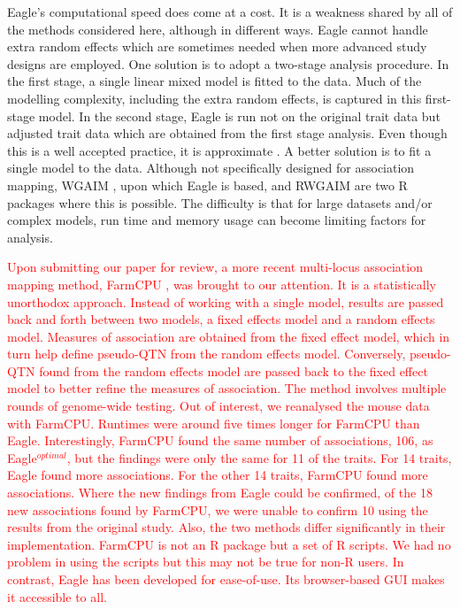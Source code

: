 \documentclass{bioinfo}
\begin{document}
Eagle's computational speed does come at a cost. It is a weakness shared by all of the methods considered here, although in different ways. 
Eagle cannot handle extra random effects which are sometimes needed when more advanced study designs are employed. One solution 
is to adopt a two-stage analysis procedure. In the first stage, a single linear mixed model is fitted to the data. Much of the modelling complexity, 
including the extra random effects, is 
captured in this first-stage model. In the second stage, Eagle is run not on the original trait data but adjusted trait data which are obtained from the first stage analysis. Even though this is a well accepted practice, it is approximate \citep{gogel2018comparison}.  A better solution is to fit a single model to the data. 
Although not specifically designed for association mapping,
WGAIM \citep{verbyla2007analysis}, upon which Eagle is based, and RWGAIM \citep{verbyla2012rwgaim}  are two R packages where this is possible. The difficulty is that for large datasets and/or complex 
models,  run time and memory usage can become limiting factors for analysis. 

\textcolor{red}{
Upon submitting our paper for review, a more recent multi-locus association mapping method, FarmCPU \citep{liu2016iterative}, was brought to our attention. 
It is a statistically unorthodox approach. Instead of working with a single model, results are passed back and forth between two models, 
a fixed effects model and a random effects model. Measures of association are obtained from the fixed effect model, which in turn 
help define pseudo-QTN from the random effects model. Conversely, pseudo-QTN found from the random effects model are passed 
back to the fixed effect model to better refine the measures of association.  The method involves multiple rounds of genome-wide 
testing. Out of interest, we reanalysed the mouse data with FarmCPU.  Runtimes were around five times longer for FarmCPU than 
Eagle.  Interestingly, FarmCPU found the same number of associations, 106,  as Eagle$^{optimal}$, but the findings were only the 
same for 11 of the traits.  For 14 traits, Eagle found more associations. For the other 14 traits, FarmCPU found more associations. 
Where the new findings from Eagle could 
be confirmed, of the 18 new associations found by FarmCPU, we were unable to confirm 10 using the results from the original study. 
Also, the two methods differ significantly in their implementation. FarmCPU is not an R package but a set of R scripts. We had 
no problem in using the scripts but this may not be true for non-R users. In contrast, Eagle has been developed for ease-of-use.
Its browser-based GUI makes it accessible to all.
}
\end{document}
